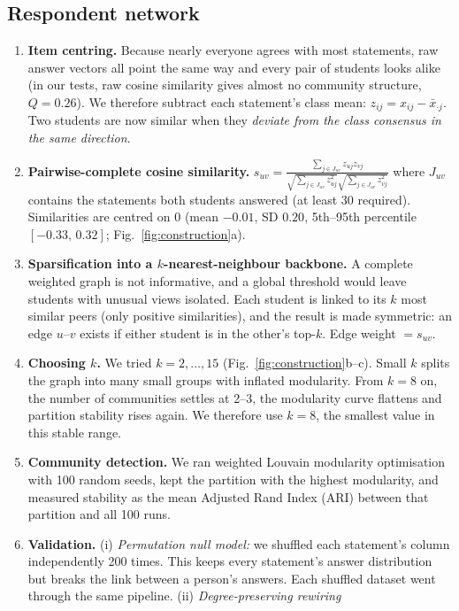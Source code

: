 \documentclass[11pt,a4paper]{article}
\begin{document}
\subsection{Respondent network}
\begin{enumerate}
\item \textbf{Item centring.} Because nearly everyone agrees with most statements, raw answer vectors all
point the same way and every pair of students looks alike (in our tests, raw cosine similarity gives
almost no community structure, $Q=0.26$). We therefore subtract each statement's class mean:
$z_{ij}=x_{ij}-\bar x_{\cdot j}$. Two students are now similar when they \emph{deviate from the class
consensus in the same direction}.
\item \textbf{Pairwise-complete cosine similarity.}
$s_{uv}=\frac{\sum_{j\in J_{uv}} z_{uj}z_{vj}}{\sqrt{\sum_{j\in J_{uv}} z_{uj}^2}\sqrt{\sum_{j\in J_{uv}} z_{vj}^2}}$
where $J_{uv}$ contains the statements both students answered (at least 30 required). Similarities are
centred on 0 (mean $-0.01$, SD $0.20$, 5th--95th percentile $[-0.33,\,0.32]$; Fig.~\ref{fig:construction}a).
\item \textbf{Sparsification into a $k$-nearest-neighbour backbone.} A complete weighted graph is not
informative, and a global threshold would leave students with unusual views isolated. Each student is
linked to its $k$ most similar peers (only positive similarities), and the result is made symmetric:
an edge $u$--$v$ exists if either student is in the other's top-$k$. Edge weight $=s_{uv}$.
\item \textbf{Choosing $k$.} We tried $k=2,\dots,15$ (Fig.~\ref{fig:construction}b--c). Small $k$ splits the graph
into many small groups with inflated modularity. From $k=8$ on, the number of communities settles at
2--3, the modularity curve flattens and partition stability rises again. We therefore use \textbf{$k=8$},
the smallest value in this stable range.
\item \textbf{Community detection.} We ran weighted Louvain modularity optimisation with 100 random seeds, kept the
partition with the highest modularity, and measured stability as the mean Adjusted Rand Index (ARI) between
that partition and all 100 runs.
\item \textbf{Validation.} (i) \emph{Permutation null model:} we shuffled each statement's column independently
200 times. This keeps every statement's answer distribution but breaks the link between a person's answers.
Each shuffled dataset went through the same pipeline. (ii) \emph{Degree-preserving rewiring}

\end{enumerate}
\end{document}
